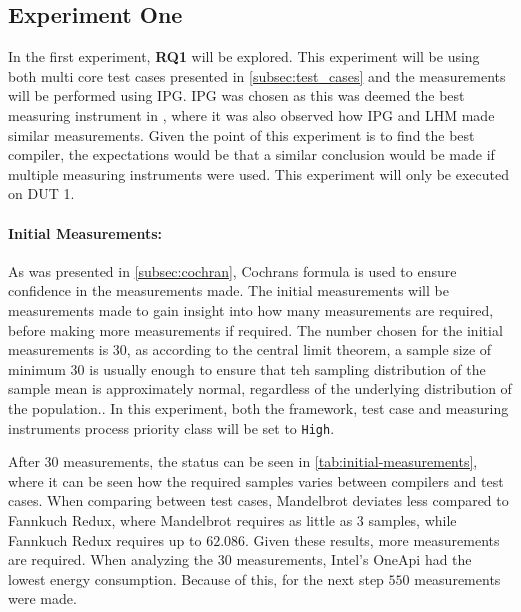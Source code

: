 \subsection{Experiment One}\label{subsec:exp_one}

In the first experiment, \textbf{RQ1} will be explored. This experiment will be using both multi core test cases presented in \cref{subsec:test_cases} and the measurements will be performed using IPG. IPG was chosen as this was deemed the best measuring instrument in \cite{biksbois}, where it was also observed how IPG and LHM made similar measurements. Given the point of this experiment is to find the best compiler, the expectations would be that a similar conclusion would be made if multiple measuring instruments were used. This experiment will only be executed on DUT 1.  

\paragraph{Initial Measurements:} As was presented in \cref{subsec:cochran}, Cochrans formula is used to ensure confidence in the measurements made. The initial measurements will be measurements made to gain insight into how many measurements are required, before making more measurements if required. The number chosen for the initial measurements is 30, as according to the central limit theorem, a sample size of minimum 30 is usually enough to ensure that teh sampling distribution of the sample mean is approximately normal, regardless of the underlying distribution of the population.\cite{central-limit-theorem}. In this experiment, both the framework, test case and measuring instruments process priority class will be set to \texttt{High}.



After 30 measurements, the status can be seen in \cref{tab:initial-measurements}, where it can be seen how the required samples varies between compilers and test cases. When comparing between test cases, Mandelbrot deviates less compared to Fannkuch Redux, where Mandelbrot requires as little as $3$ samples, while Fannkuch Redux requires up to $62.086$. Given these results, more measurements are required. When analyzing the 30 measurements, Intel's OneApi had the lowest energy consumption. Because of this, for the next step $550$ measurements were made.




